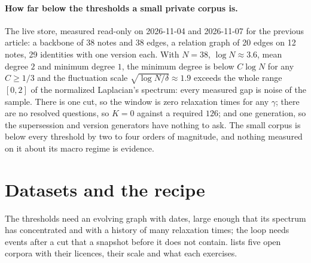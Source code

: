 \documentclass[11pt,a4paper]{article}
\theoremstyle{plain}
\theoremstyle{definition}
\theoremstyle{remark}
\begin{document}
\paragraph{How far below the thresholds a small private corpus is.}
The live store, measured read-only on 2026-11-04 and 2026-11-07 for the previous article: a
backbone of 38 notes and 38 edges, a relation graph of 20 edges on 12 notes, 29 identities with one
version each. With $N = 38$, $\log N \approx 3.6$, mean degree $2$ and minimum degree $1$, the
minimum degree is below $C\log N$ for any $C \ge 1/3$ and the fluctuation scale
$\sqrt{\log N/\delta} \approx 1.9$ exceeds the whole range $[0,2]$ of the normalized Laplacian's
spectrum: every measured gap is noise of the sample. There is one cut, so the window is zero
relaxation times for any $\gamma$; there are no resolved questions, so $K = 0$ against a required
$126$; and one generation, so the supersession and version generators have nothing to ask. The
small corpus is below every threshold by two to four orders of magnitude, and nothing measured on it
about its macro regime is evidence.

\section{Datasets and the recipe}\label{sec:datasets}

The thresholds need an evolving graph with dates, large enough that its spectrum has concentrated
and with a history of many relaxation times; the loop needs events after a cut that a snapshot before
it does not contain.  lists five open corpora with their licences, their scale
and what each exercises.
\end{document}
